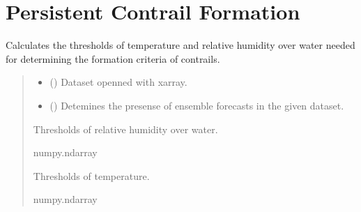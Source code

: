 \documentclass[a4paper,11pt,english]{sphinxmanual}
\begin{document}
\section{Persistent Contrail Formation}
\label{\detokenize{modules:module-envlib.contrail}}\label{\detokenize{modules:persistent-contrail-formation}}

\begin{fulllineitems}
\label{\detokenize{modules:envlib.contrail.get_cont_form_thr}}
\pysigstartsignatures
{}
\pysigstopsignatures
\sphinxAtStartPar
Calculates the thresholds of temperature and relative humidity over water needed for determining the
formation criteria of contrails.
\begin{quote}\begin{description}
\begin{itemize}
\item {} 
\sphinxAtStartPar
{} () \textendash{} Dataset openned with xarray.

\item {} 
\sphinxAtStartPar
{} () \textendash{} Detemines the presense of ensemble forecasts in the given dataset.

\end{itemize}

\sphinxAtStartPar
Thresholds of relative humidity over water.

\sphinxAtStartPar
numpy.ndarray

\sphinxAtStartPar
Thresholds of temperature.

\sphinxAtStartPar
numpy.ndarray

\end{description}\end{quote}

\end{fulllineitems}
\end{document}
